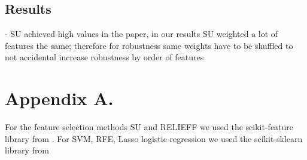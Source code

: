 \documentclass[twoside,11pt]{article}
\begin{document}
\subsection{Results}
- SU achieved high values in the paper, in our results SU weighted a lot of features the 
same; therefore for robustness same weights have to be shuffled to not accidental increase
robustness by order of features






\newpage

\appendix
\section*{Appendix A.}
For the feature selection methods SU and RELIEFF we used the scikit-feature library from \cite{Li-etal16}.
For SVM, RFE, Lasso logistic regression we used the scikit-sklearn library from \cite{scikit-learn}
\label{app:some appendix}


\vskip 0.2in

\end{document}
